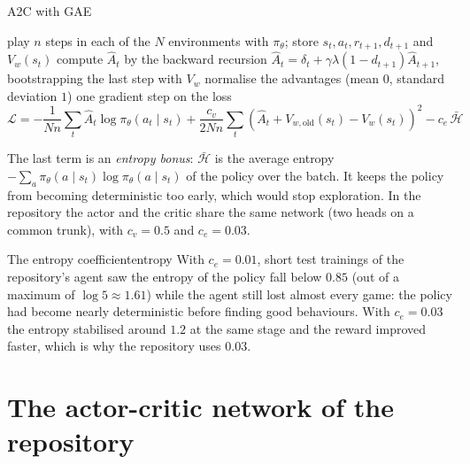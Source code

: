 \begin{algobox}{A2C with GAE}
  \begin{algorithmic}[1]
      \State play $n$ steps in each of the $N$ environments with
        $\pi_\theta$; store $s_t, a_t, r_{t+1}, d_{t+1}$ and $V_w(s_t)$
      \State compute $\hat A_t$ by the backward recursion
        $\hat A_t = \delta_t + \gamma \lambda (1 - d_{t+1}) \hat A_{t+1}$,
        bootstrapping the last step with $V_w$
      \State normalise the advantages (mean $0$, standard deviation $1$)
      \State one gradient step on the loss
        \begin{equation*}
          \mathcal{L} = -\frac{1}{Nn} \sum_t \hat A_t \log \pi_\theta(a_t
          \mid s_t) + \frac{c_v}{2Nn} \sum_t \left( \hat A_t + V_{w,
          \text{old}}(s_t) - V_w(s_t) \right)^2 - c_e\, \bar{\mathcal{H}}
        \end{equation*}
    \EndFor
  \end{algorithmic}
\end{algobox}

The last term is an \emph{entropy bonus}: $\bar{\mathcal{H}}$ is the
average entropy $-\sum_a \pi_\theta(a \mid s_t) \log \pi_\theta(a \mid s_t)$
of the policy over the batch. It keeps the policy from becoming
deterministic too early, which would stop exploration. In the repository
the actor and the critic share the same network (two heads on a common
trunk), with $c_v = 0.5$ and $c_e = 0.03$.

\begin{pacman}{The entropy coefficient}{entropy}
  With $c_e = 0.01$, short test trainings of the repository's agent saw the
  entropy of the policy fall below $0.85$ (out of a maximum of $\log 5
  \approx 1.61$) while the agent still lost almost every game: the policy
  had become nearly deterministic before finding good behaviours. With
  $c_e = 0.03$ the entropy stabilised around $1.2$ at the same stage and the
  reward improved faster, which is why the repository uses $0.03$.
\end{pacman}

\section{The actor-critic network of the repository}

